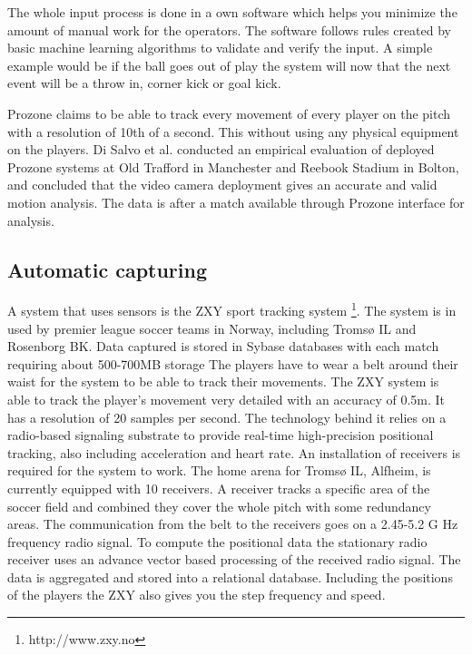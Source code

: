 The whole input process is done in a own software which helps you minimize the amount of manual work for the operators. The software follows rules created by basic machine learning algorithms to validate and verify the input. A simple example would be if the ball goes out of play the system will now that the next event will be a throw in, corner kick or goal kick.

Prozone claims to be able to track every movement of every player on the pitch with a resolution of 10th of a second. This without using any physical equipment on the players. Di Salvo et al. \cite{Prozone:validation} conducted an empirical evaluation of deployed Prozone systems at Old Trafford in Manchester and Reebook Stadium in Bolton, and concluded that the video camera deployment gives an accurate and valid motion analysis. The data is after a match available through Prozone interface for analysis. 

\subsection{Automatic capturing}

A system that uses sensors is the ZXY sport tracking system \footnote{http://www.zxy.no}. The system is in used by premier league soccer teams in Norway, including Tromsø IL and Rosenborg BK. Data captured is stored in Sybase databases with each match requiring about 500-700MB storage The players have to wear a belt around their waist for the system to be able to track their movements. The ZXY system is able to track the player’s movement very detailed with an accuracy of 0.5m. It has a resolution of 20 samples per second. The technology behind it relies on a radio-based signaling substrate to provide real-time high-precision positional tracking, also including acceleration and heart rate. An installation of receivers is required for the system to work. The home arena for Tromsø IL, Alfheim, is currently equipped with 10 receivers. A receiver tracks a specific area of the soccer field and combined they cover the whole pitch with some redundancy areas. The communication from the belt to the receivers goes on a 2.45-5.2 G Hz frequency radio signal. To compute the positional data the stationary radio receiver uses an advance vector based processing of the received radio signal. The data is aggregated and stored into a relational database. Including the positions of the players the ZXY also gives you the step frequency and speed. 

